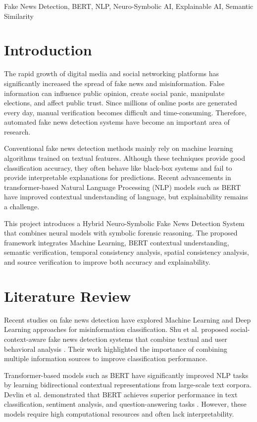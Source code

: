 \documentclass[conference]{IEEEtran}
\begin{document}
\begin{IEEEkeywords}
Fake News Detection, BERT, NLP, Neuro-Symbolic AI, Explainable AI, Semantic Similarity
\end{IEEEkeywords}

\section{Introduction}
The rapid growth of digital media and social networking platforms has significantly increased the spread of fake news and misinformation. False information can influence public opinion, create social panic, manipulate elections, and affect public trust. Since millions of online posts are generated every day, manual verification becomes difficult and time-consuming. Therefore, automated fake news detection systems have become an important area of research.

Conventional fake news detection methods mainly rely on machine learning algorithms trained on textual features. Although these techniques provide good classification accuracy, they often behave like black-box systems and fail to provide interpretable explanations for predictions. Recent advancements in transformer-based Natural Language Processing (NLP) models such as BERT have improved contextual understanding of language, but explainability remains a challenge.

This project introduces a Hybrid Neuro-Symbolic Fake News Detection System that combines neural models with symbolic forensic reasoning. The proposed framework integrates Machine Learning, BERT contextual understanding, semantic verification, temporal consistency analysis, spatial consistency analysis, and source verification to improve both accuracy and explainability.

\section{Literature Review}
Recent studies on fake news detection have explored Machine Learning and Deep Learning approaches for misinformation classification. Shu et al. proposed social-context-aware fake news detection systems that combine textual and user behavioral analysis \cite{shu2017fake, shu2019beyond}. Their work highlighted the importance of combining multiple information sources to improve classification performance.

Transformer-based models such as BERT have significantly improved NLP tasks by learning bidirectional contextual representations from large-scale text corpora. Devlin et al. demonstrated that BERT achieves superior performance in text classification, sentiment analysis, and question-answering tasks \cite{devlin2019bert}. However, these models require high computational resources and often lack interpretability.
\end{document}
